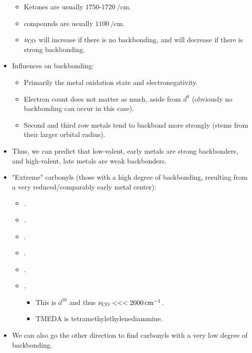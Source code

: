 \documentclass[../notes.tex]{subfiles}
\begin{document}
\begin{itemize}
    \begin{itemize}
        \item Ketones are usually $\num{1750}$-$\SI{1720}{\per\centi\meter}$.
        \item {} compounds are usually $\SI{1100}{\per\centi\meter}$.
        \item $\nu_{\ce{CO}}$ will increase if there is no backbonding, and will decrease if there is strong backbonding.
    \end{itemize}
    \item Influences on backbonding:
    \begin{itemize}
        \item Primarily the metal oxidation state and electronegativity.
        \item Electron count does not matter as much, aside from $d^0$ (obviously no backbonding can occur in this case).
        \item Second and third row metals tend to backbond more strongly (stems from their larger orbital radius).
    \end{itemize}
    \item Thus, we can predict that low-valent, early metals are strong backbonders, and high-valent, late metals are weak backbonders.
    \item "Extreme" carbonyls (those with a high degree of backbonding, resulting from a very reduced/comparably early metal center):
    \begin{itemize}
        \item {}.
        \item {}.
        \item {}.
        \item {}.
        \item {}.
        \item {}.
        \begin{itemize}
            \item This is $d^{10}$ and thus $\nu_{\ce{CO}}<<<\SI{2000}{\per\centi\meter}$.
            \item TMEDA is tetramethylethylenediammine.
        \end{itemize}
    \end{itemize}
    \item We can also go the other direction to find carbonyls with a very low degree of backbonding.

\end{itemize}
\end{document}
